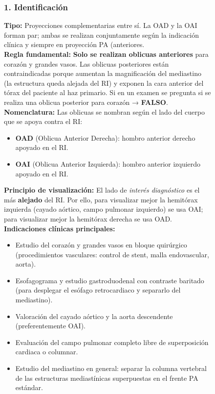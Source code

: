 \begin{figure}
{\subsubsection*{1. Identificación}

\textbf{Tipo:} Proyecciones complementarias entre sí. La OAD y la OAI forman par; ambas se realizan
conjuntamente según la indicación clínica y siempre en proyección PA (anteriores.\\

\textbf{Regla fundamental:} \textbf{Solo se realizan oblicuas anteriores} para corazón y grandes vasos.
Las oblicuas posteriores están contraindicadas porque aumentan la magnificación del mediastino
(la estructura queda alejada del RI) y exponen la cara anterior del tórax del paciente al haz
primario. Si en un examen se pregunta si se realiza una oblicua posterior para corazón
→ \textbf{FALSO}.\\

\textbf{Nomenclatura:} Las oblicuas se nombran según el lado del cuerpo que se apoya contra el RI:

\begin{tcolorbox}[colback=red!5!white, colframe=red!80!black, fonttitle=\bfseries, title=Importante]
\begin{itemize}
  \item \textbf{OAD} (Oblicua Anterior Derecha): hombro anterior derecho apoyado en el RI.
  \item \textbf{OAI} (Oblicua Anterior Izquierda): hombro anterior izquierdo apoyado en el RI.
\end{itemize}
\end{tcolorbox}

\textbf{Principio de visualización:} El lado de \textit{interés diagnóstico} es el más \textbf{alejado} del RI.
Por ello, para visualizar mejor la hemitórax izquierda (cayado aórtico, campo pulmonar izquierdo)
se usa OAI; para visualizar mejor la hemitórax derecha se usa OAD.\\

\textbf{Indicaciones clínicas principales:}

\begin{itemize}
  \item Estudio del corazón y grandes vasos en bloque quirúrgico (procedimientos vasculares:
        control de stent, malla endovascular, aorta).
  \item Esofagograma y estudio gastroduodenal con contraste baritado (para desplegar el esófago
        retrocardiaco y separarlo del mediastino).
  \item Valoración del cayado aórtico y la aorta descendente (preferentemente OAI).
  \item Evaluación del campo pulmonar completo libre de superposición cardiaca o columnar.
  \item Estudio del mediastino en general: separar la columna vertebral de las estructuras
        mediastínicas superpuestas en el frente PA estándar.
\end{itemize}

}
\end{figure}
